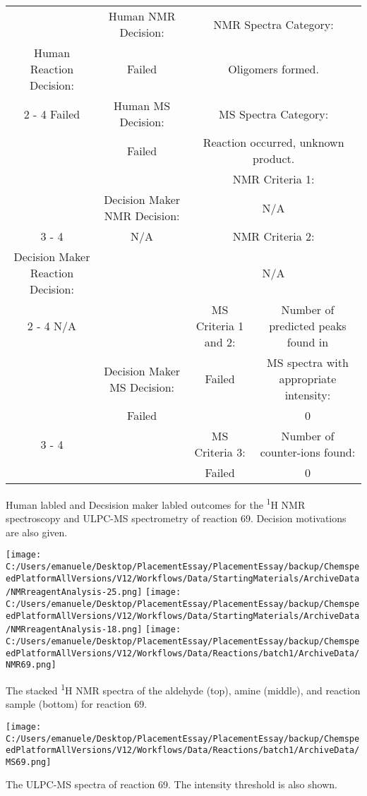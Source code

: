 \documentclass{article}%
\begin{document}
\begin{Decision Table}[H]%
\begin{tabular}{|c|c|c|c|}%
\hline%
&Human NMR Decision:&\multicolumn{2}{|c|}{NMR Spectra Category:}\\%
Human Reaction Decision:&Failed&\multicolumn{2}{|c|}{Oligomers formed.}\\%
\cline{2%
-%
4}%
Failed&Human MS Decision:&\multicolumn{2}{|c|}{MS Spectra Category:}\\%
&Failed&\multicolumn{2}{|c|}{Reaction occurred, unknown product.}\\%
\hline%
&&\multicolumn{2}{|c|}{NMR Criteria 1:}\\%
&Decision Maker NMR Decision:&\multicolumn{2}{|c|}{N/A}\\%
\cline{3%
-%
4}%
&N/A&\multicolumn{2}{|c|}{NMR Criteria 2:}\\%
Decision Maker Reaction Decision:&&\multicolumn{2}{|c|}{N/A}\\%
\cline{2%
-%
4}%
N/A&&MS Criteria 1 and 2:&Number of predicted peaks found in\\%
&Decision Maker MS Decision:&Failed&MS spectra with appropriate intensity:\\%
&Failed&&0\\%
\cline{3%
-%
4}%
&&MS Criteria 3:&Number of counter{-}ions found:\\%
&&Failed&0\\%
\hline%
\end{tabular}%
\caption{Human labled and Decsision maker labled outcomes for the \textsuperscript{1}H NMR spectroscopy and ULPC-MS spectrometry of reaction 69. Decision motivations are also given.}%
\end{Decision Table}%
\begin{NMR Spectra}[H]%
\begin{center}%
\texttt{[image: C:/Users/emanuele/Desktop/PlacementEssay/PlacementEssay/backup/ChemspeedPlatformAllVersions/V12/Workflows/Data/StartingMaterials/ArchiveData/NMRreagentAnalysis-25.png]}\hfill%
\texttt{[image: C:/Users/emanuele/Desktop/PlacementEssay/PlacementEssay/backup/ChemspeedPlatformAllVersions/V12/Workflows/Data/StartingMaterials/ArchiveData/NMRreagentAnalysis-18.png]}\hfill%
\texttt{[image: C:/Users/emanuele/Desktop/PlacementEssay/PlacementEssay/backup/ChemspeedPlatformAllVersions/V12/Workflows/Data/Reactions/batch1/ArchiveData/NMR69.png]}\hfill%
\end{center}%
\caption{The stacked \textsuperscript{1}H NMR spectra of the aldehyde (top), amine (middle), and reaction sample (bottom) for reaction 69.}%
\end{NMR Spectra}%
\begin{MS Spectra}[H]%
\begin{center}%
\texttt{[image: C:/Users/emanuele/Desktop/PlacementEssay/PlacementEssay/backup/ChemspeedPlatformAllVersions/V12/Workflows/Data/Reactions/batch1/ArchiveData/MS69.png]}\hfill%
\end{center}%
\caption{The ULPC-MS spectra of reaction 69. The intensity threshold is also shown.}%
\end{MS Spectra}%
\end{document}
